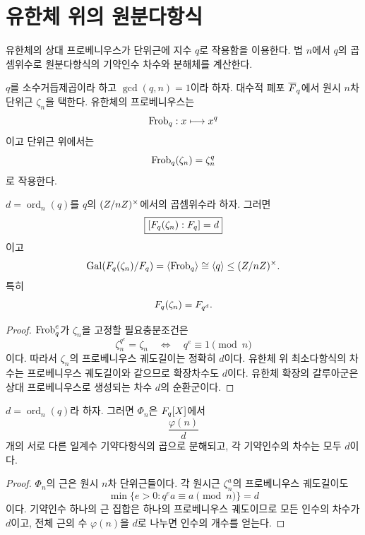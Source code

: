\clearpage
\section{유한체 위의 원분다항식}
\label{sec:finite-field-cyclotomy}

\begin{learninggoal}
유한체의 상대 프로베니우스가 단위근에 지수 $q$로 작용함을 이용한다. 법 $n$에서 $q$의 곱셈위수로 원분다항식의 기약인수 차수와 분해체를 계산한다.
\end{learninggoal}

$q$를 소수거듭제곱이라 하고 $\gcd(q,n)=1$이라 하자. 대수적 폐포 $\overline{F}_q$에서 원시 $n$차 단위근 $\zeta_n$을 택한다. 유한체의 프로베니우스는
\[
  \operatorname{Frob}_q:x\longmapsto x^q
\]
이고 단위근 위에서는
\[
  \operatorname{Frob}_q(\zeta_n)=\zeta_n^q
\]
로 작용한다.

\begin{theorem}
\label{thm:finite-field-cyclotomic-degree}
$d=\operatorname{ord}_n(q)$를 $q$의 $(Z/nZ)^\times$에서의 곱셈위수라 하자. 그러면
\[
  \boxed{[F_q(\zeta_n):F_q]=d}
\]
이고
\[
  \operatorname{Gal}(F_q(\zeta_n)/F_q)
  =\langle\operatorname{Frob}_q\rangle
  \cong\langle q\rangle
  \le(Z/nZ)^\times.
\]
특히
\[
  F_q(\zeta_n)=F_{q^d}.
\]
\end{theorem}

\begin{proof}
$\operatorname{Frob}_q^e$가 $\zeta_n$을 고정할 필요충분조건은
\[
  \zeta_n^{q^e}=\zeta_n
  \quad\Longleftrightarrow\quad
  q^e\equiv1\pmod n
\]
이다. 따라서 $\zeta_n$의 프로베니우스 궤도길이는 정확히 $d$이다. 유한체 위 최소다항식의 차수는 프로베니우스 궤도길이와 같으므로 확장차수도 $d$이다. 유한체 확장의 갈루아군은 상대 프로베니우스로 생성되는 차수 $d$의 순환군이다.
\end{proof}

\begin{corollary}[원분다항식의 인수 차수]
\label{cor:finite-field-cyclotomic-factorization}
$d=\operatorname{ord}_n(q)$라 하자. 그러면 $\Phi_n$은 $F_q[X]$에서
\[
  \boxed{\frac{\varphi(n)}d}
\]
개의 서로 다른 일계수 기약다항식의 곱으로 분해되고, 각 기약인수의 차수는 모두 $d$이다.
\end{corollary}

\begin{proof}
$\Phi_n$의 근은 원시 $n$차 단위근들이다. 각 원시근 $\zeta_n^a$의 프로베니우스 궤도길이도
\[
  \min\{e>0:q^e a\equiv a\pmod n\}=d
\]
이다. 기약인수 하나의 근 집합은 하나의 프로베니우스 궤도이므로 모든 인수의 차수가 $d$이고, 전체 근의 수 $\varphi(n)$을 $d$로 나누면 인수의 개수를 얻는다.
\end{proof}

